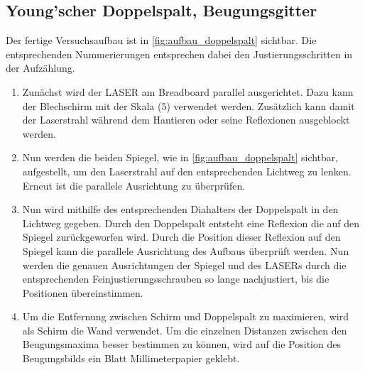 \documentclass[12pt,english,ngerman]{scrartcl}
\begin{document}
\subsection{Young'scher Doppelspalt, Beugungsgitter}

Der fertige Versuchsaufbau ist in \autoref{fig:aufbau_doppelspalt} sichtbar.
Die entsprechenden Nummerierungen entsprechen dabei den Justierungsschritten in
der Aufzählung.

\begin{enumerate}
	\item Zunächst wird der LASER am Breadboard parallel ausgerichtet. Dazu kann der
	      Blechschirm mit der Skala (5) verwendet werden. Zusätzlich kann damit der
	      Laserstrahl während dem Hantieren oder seine Reflexionen ausgeblockt werden.
	\item Nun werden die beiden Spiegel, wie in \autoref{fig:aufbau_doppelspalt}
	      sichtbar, aufgestellt, um den Laserstrahl auf den entsprechenden Lichtweg zu
	      lenken. Erneut ist die parallele Ausrichtung zu überprüfen.
	\item Nun wird mithilfe des entsprechenden Diahalters der Doppelspalt in den Lichtweg
	      gegeben. Durch den Doppelspalt entsteht eine Reflexion die auf den Spiegel
	      zurückgeworfen wird. Durch die Position dieser Reflexion auf den Spiegel kann
	      die parallele Ausrichtung des Aufbaus überprüft werden. Nun werden die genauen
	      Ausrichtungen der Spiegel und des LASERs durch die entsprechenden
	      Feinjustierungsschrauben so lange nachjustiert, bis die Positionen
	      übereinstimmen.
	\item Um die Entfernung zwischen Schirm und Doppelspalt zu maximieren, wird als
	      Schirm die Wand verwendet. Um die einzelnen Distanzen zwischen den
	      Beugungsmaxima besser bestimmen zu können, wird auf die Position des
	      Beugungsbilds ein Blatt Millimeterpapier geklebt.
\end{enumerate}
\end{document}
